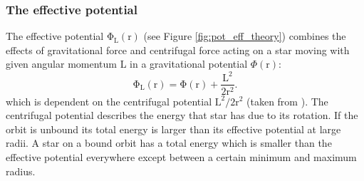 \subsubsection{The effective potential}\label{sec:pot_eff}
The effective potential \(\mathrm{\Phi_{L}(r)}\) (see Figure \ref{fig:pot_eff_theory}) combines the effects of gravitational force and centrifugal force acting on a star moving with given angular momentum L in a gravitational potential \(\Phi(\mathrm{r})\):
\begin{equation}\label{eq:eff_pot}
\mathrm{\Phi_L(r)=\Phi(r)+\frac{L^2}{2r^2}}.
\end{equation} 
which is dependent on the centrifugal potential \(\mathrm{L^2/2r^2}\) (taken from \citealp[p. 59, eq. 6.27]{bartelmann}). The centrifugal potential describes the energy that star has due to its rotation. If the orbit is unbound its total energy is larger than its effective potential at large radii. A star on a bound orbit has a total energy which is smaller than the effective potential everywhere except between a certain minimum and maximum radius. 
